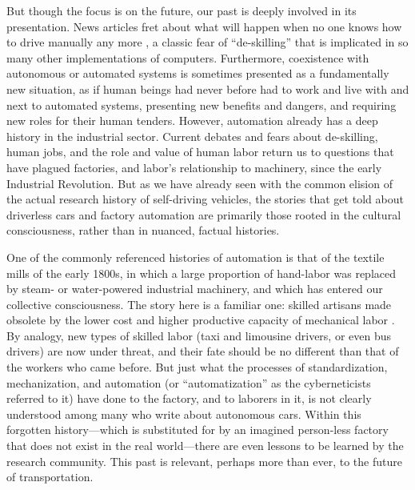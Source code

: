 But though the focus is on the future, our past is deeply involved
in its presentation. News articles fret
about what will happen when no one knows how to drive manually any
more \cite{pross}, a classic fear of ``de-skilling'' that is implicated in so many
other implementations of computers. Furthermore, coexistence with
autonomous or automated systems is sometimes presented as a fundamentally new
situation, as if human beings had never before had to work and live
with and next to automated systems, presenting new benefits and
dangers, and requiring new roles for their human tenders. However,
automation already has a deep 
history in the industrial sector. Current debates and fears about de-skilling, human jobs,
and the role and value of human labor return us to questions that have
plagued factories, and labor's relationship to machinery, since the
early Industrial Revolution. But as we have already seen with the common
elision of the actual research history of self-driving vehicles, the
stories that get told about driverless cars and factory automation are
primarily those rooted in the cultural consciousness, rather than in
nuanced, factual histories.

One of the commonly referenced histories of automation is that of the
textile mills of the early 1800s, in which a large
proportion of hand-labor was replaced by steam- or
water-powered industrial machinery, and which has entered our collective
consciousness. The
story here is a familiar one: skilled artisans made obsolete by the
lower cost and higher productive capacity of mechanical labor \cite{pewPositive}. By
analogy, new types of skilled labor (taxi and limousine drivers, or
even bus drivers) are now under threat, and their fate should be no
different than that of the workers who came before. But just what the
processes of standardization, mechanization, and automation (or
``automatization'' as the cyberneticists referred to it) have done to
the factory, and to laborers in it, is 
not clearly understood among many who write about autonomous cars. Within this
forgotten history---which is substituted for by an imagined person-less
factory that does not exist in the real world---there are even lessons to be
learned by the research community. This past is relevant, perhaps
more than ever, to the future of transportation.

